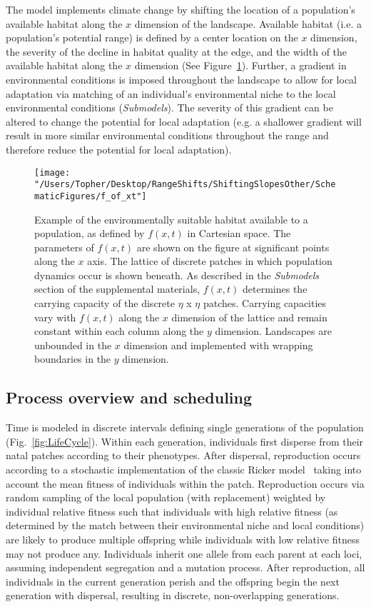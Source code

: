 \documentclass[12pt, oneside]{article}
\begin{document}
The model implements climate change by shifting the location of a population's available habitat along the $x$ dimension of the landscape. Available habitat (i.e. a population's potential range) is defined by a center location on the $x$ dimension, the severity of the decline in habitat quality at the edge, and the width of the available habitat along the $x$ dimension (See Figure~\ref{fig:EnvFunction}). Further, a gradient in environmental conditions is imposed throughout the landscape to allow for local adaptation via matching of an individual's environmental niche to the local environmental conditions (\textit{Submodels}). The severity of this gradient can be altered to change the potential for local adaptation (e.g. a shallower gradient will result in more similar environmental conditions throughout the range and therefore reduce the potential for local adaptation).

\begin{figure}
\centering
\texttt{[image: "/Users/Topher/Desktop/RangeShifts/ShiftingSlopesOther/SchematicFigures/f\_of\_xt"]}
\vspace{-5mm}
\caption[LoF entry]{Example of the environmentally suitable habitat available to a population, as defined by $f(x,t)$ in Cartesian space. The parameters of $f(x,t)$ are shown on the figure at significant points along the $x$ axis. The lattice of discrete patches in which population dynamics occur is shown beneath. As described in the \textit{Submodels} section of the supplemental materials, $f(x,t)$ determines the carrying capacity of the discrete $\eta$ x $\eta$ patches. Carrying capacities vary with $f(x,t)$ along the $x$ dimension of the lattice and remain constant within each column along the $y$ dimension. Landscapes are  unbounded in the $x$ dimension and implemented with wrapping boundaries in the $y$ dimension.}
\label{fig:EnvFunction}
\end{figure}

\subsection*{Process overview and scheduling} 
Time is modeled in discrete intervals defining single generations of the population (Fig.~\ref{fig:LifeCycle}). Within each generation, individuals first disperse from their natal patches according to their phenotypes. After dispersal, reproduction occurs according to a stochastic implementation of the classic Ricker model~\citep{ricker1954stock} taking into account the mean fitness of individuals within the patch. Reproduction occurs via random sampling of the local population (with replacement) weighted by individual relative fitness such that individuals with high relative fitness (as determined by the match between their environmental niche and local conditions) are likely to produce multiple offspring while individuals with low relative fitness may not produce any. Individuals inherit one allele from each parent at each loci, assuming independent segregation and a mutation process. After reproduction, all individuals in the current generation perish and the offspring begin the next generation with dispersal, resulting in discrete, non-overlapping generations. 
\end{document}

